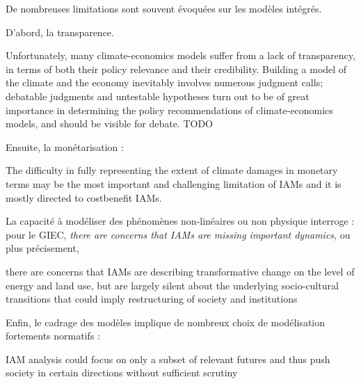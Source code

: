 De nombreuses limitations sont souvent évoquées sur les modèles intégrés. 

D'abord, la transparence.

\begin{authoredquote}
    Unfortunately, many climate-economics models suffer from a lack of transparency, in terms of both their policy relevance and their credibility. Building a model of the climate and the economy inevitably involves numerous judgment calls; debatable judgments and untestable hypotheses turn out to be of great importance in determining the policy recommendations of climate-economics models, and should be visible for debate. TODO
\end{authoredquote}

Ensuite, la monétarisation : 

\begin{authoredquote}
    The difficulty in fully representing the extent of climate damages in monetary terms may be the most important and challenging limitation of IAMs and it is mostly directed to costbenefit IAMs. 
\end{authoredquote}

La capacité à modéliser des phénomènes non-linéaires ou non physique interroge : pour le \Gls{GIEC}, \emph{there are concerns that IAMs are missing important dynamics}, ou plus précisement, 

\begin{authoredquote}
    there are concerns that IAMs are describing transformative change on the level of energy and land use, but are largely silent about the underlying socio-cultural transitions that could imply restructuring of society and institutions
\end{authoredquote}

Enfin, le cadrage des modèles implique de nombreux choix de modélisation fortements normatifs : 

\begin{authoredquote}
    IAM analysis could focus on only a subset of relevant futures and thus push society in certain directions without sufficient scrutiny
\end{authoredquote}



